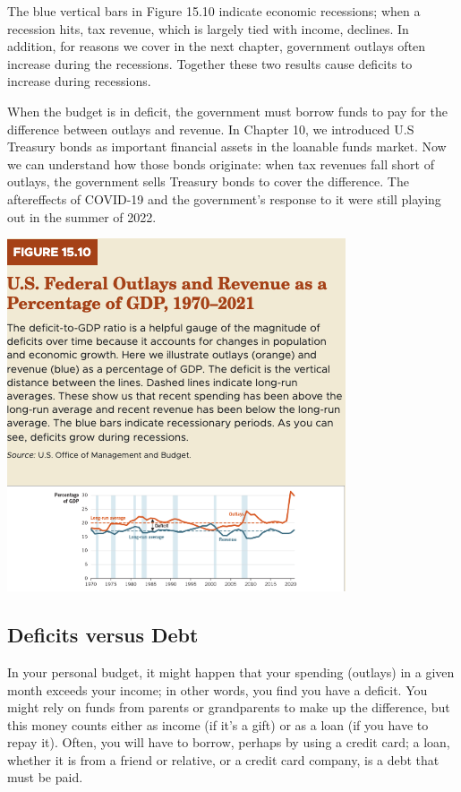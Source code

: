 \documentclass[11pt]{article} %
\begin{document}
The blue vertical bars in Figure 15.10 indicate economic recessions; when a recession hits, tax revenue, which is largely tied with income, declines. In addition, for reasons we cover in the next chapter, government outlays often increase during the recessions. Together these two results cause deficits to increase during recessions.

When the budget is in deficit, the government must borrow funds to pay for the difference between outlays and revenue. In Chapter 10, we introduced U.S Treasury bonds as important financial assets in the loanable funds market. Now we can understand how those bonds originate: when tax revenues fall short of outlays, the government sells Treasury bonds to cover the difference. The aftereffects of COVID-19 and the government's response to it were still playing out in the summer of 2022.

\begin{center}
\includegraphics[scale=0.5]{images/Figure 15.10.png}
\end{center}
\subsection*{Deficits versus Debt}
In your personal budget, it might happen that your spending (outlays) in a given month exceeds your income; in other words, you find you have a deficit. You might rely on funds from parents or grandparents to make up the difference, but this money counts either as income (if it's a gift) or as a loan (if you have to repay it). Often, you will have to borrow, perhaps by using a credit card; a loan, whether it is from a friend or relative, or a credit card company, is a debt that must be paid.
\end{document}
